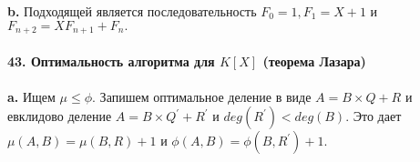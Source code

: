 \documentclass{../../template/mai_book}
\begin{document}
{\hspace*{15pt}\textbf{b.} Подходящей является последовательность $F_0 = 1, F_1 = X + 1$ и\linebreak
$ F_{n+2} = XF_{n+1} + F_n.$\\
\\
\noindent\textbf{43. Оптимальность алгоритма для $K[X]$ (теорема Лазара)}\\
\\
\hspace*{15pt}\textbf{a.} Ищем $\mu \leq \phi$. Запишем оптимальное деление в виде $A = B \times Q + R$\linebreak
и евклидово деление $A = B \times Q^{'} + R^{'}$ и $deg(R^{'}) < deg(B)$. Это дает\linebreak
$\mu(A, B) = \mu(B, R) + 1$ и $\phi(A, B) = \phi(B, R^{'}) + 1.$\\

}
\end{document}
